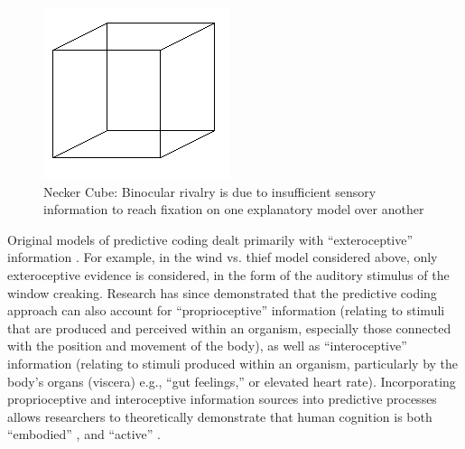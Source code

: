 \begin{CJK}{UTF8}{gbsn}
\begin{figure}[htbp]
  \begin{center}
    \includegraphics[scale=.7]{images/Necker_cube.png}
      \caption{Necker Cube: Binocular rivalry is due to insufficient sensory information to reach fixation on one explanatory model over another}
        \label{fig:neckerCube}
   \end{center}
\end{figure}

Original models of predictive coding dealt primarily with ``exteroceptive'' information \citep[relating to stimuli that are external to an organism, i.e. visual, auditory, haptic perception][]{Rao1999,Friston2010}.  For example, in the wind vs. thief model considered above, only exteroceptive evidence is considered, in the form of the auditory stimulus of the window creaking.  Research has since demonstrated that the predictive coding approach can also account for ``proprioceptive'' information (relating to stimuli that are produced and perceived within an organism, especially those connected with the position and movement of the body), as well as ``interoceptive'' information (relating to stimuli produced within an organism, particularly by the body's organs (viscera) e.g., ``gut feelings,'' or elevated heart rate).  Incorporating proprioceptive and interoceptive information sources into predictive processes allows researchers to theoretically demonstrate that human cognition is both ``embodied'' \citep[inference is rooted in and contingent upon visceral, interoceptive information ][]{Pezzulo2014}, and ``active'' \citep[in the sense that humans can move throughout the environment to reduce the discrepancy between proprioceptive predictions and actual body states][]{Friston2010,Clark2015}.


\end{CJK}
